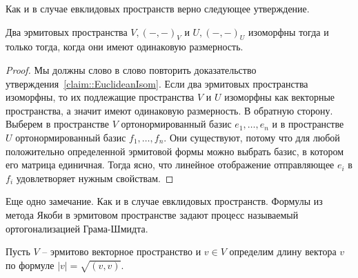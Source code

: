 Как и в случае евклидовых пространств верно следующее утверждение.

\begin{claim}
Два эрмитовых пространства $V, ({-},{-})_V$ и $U, ({-},{-})_U$  изоморфны тогда и только тогда, когда они имеют одинаковую размерность.
\end{claim}
\begin{proof}
Мы должны слово в слово повторить доказательство утверждения~\ref{claim::EuclideanIsom}.
Если два эрмитовых пространства изоморфны, то их подлежащие пространства $V$ и $U$ изоморфны как векторные пространства, а значит имеют одинаковую размерность.
В обратную сторону.
Выберем в пространстве $V$ ортонормированный базис $e_1,\ldots,e_n$ и в пространстве $U$ ортонормированный базис $f_1,\ldots, f_n$.
Они существуют, потому что для любой положительно определенной эрмитовой формы можно выбрать базис, в котором его матрица единичная.
Тогда ясно, что линейное отображение отправляющее $e_i$ в $f_i$ удовлетворяет нужным свойствам.
\end{proof}

Еще одно замечание.
Как и в случае евклидовых пространств.
Формулы из метода Якоби в эрмитовом пространстве задают процесс называемый ортогонализацией Грама-Шмидта.


\begin{definition}
Пусть $V$ -- эрмитово векторное пространство и $v\in V$ определим длину вектора $v$ по формуле $|v| = \sqrt{(v,v)}$.
\end{definition}

